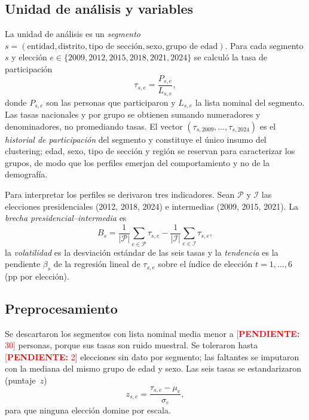 \documentclass[11pt,letterpaper]{article}
\newcommand{\pend}[1]{\textcolor{red}{[\textbf{PENDIENTE:} #1]}}
\begin{document}
\subsection{Unidad de an\'alisis y variables}
La unidad de an\'alisis es un \emph{segmento} $s=(\text{entidad},\text{distrito},\text{tipo de secci\'on},\text{sexo},\text{grupo de edad})$. Para cada segmento $s$ y elecci\'on $e\in\{2009,2012,2015,2018,2021,2024\}$ se calcul\'o la tasa de participaci\'on
\begin{equation}
  \tau_{s,e}=\frac{P_{s,e}}{L_{s,e}},
\end{equation}
donde $P_{s,e}$ son las personas que participaron y $L_{s,e}$ la lista nominal del segmento. Las tasas nacionales y por grupo se obtienen sumando numeradores y denominadores, no promediando tasas. El vector $(\tau_{s,2009},\dots,\tau_{s,2024})$ es el \emph{historial de participaci\'on} del segmento y constituye el \'unico insumo del clustering; edad, sexo, tipo de secci\'on y regi\'on se reservan para caracterizar los grupos, de modo que los perfiles emerjan del comportamiento y no de la demograf\'ia.

Para interpretar los perfiles se derivaron tres indicadores. Sean $\mathcal{P}$ y $\mathcal{I}$ las elecciones presidenciales (2012, 2018, 2024) e intermedias (2009, 2015, 2021). La \emph{brecha presidencial--intermedia} es
\begin{equation}
  B_s=\frac{1}{|\mathcal{P}|}\sum_{e\in\mathcal{P}}\tau_{s,e}-\frac{1}{|\mathcal{I}|}\sum_{e\in\mathcal{I}}\tau_{s,e},
\end{equation}
la \emph{volatilidad} es la desviaci\'on est\'andar de las seis tasas y la \emph{tendencia} es la pendiente $\beta_s$ de la regresi\'on lineal de $\tau_{s,e}$ sobre el \'indice de elecci\'on $t=1,\dots,6$ (pp por elecci\'on).

\subsection{Preprocesamiento}
Se descartaron los segmentos con lista nominal media menor a \pend{30} personas, porque sus tasas son ruido muestral. Se toleraron hasta \pend{2} elecciones sin dato por segmento; las faltantes se imputaron con la mediana del mismo grupo de edad y sexo. Las seis tasas se estandarizaron (puntaje~$z$)
\begin{equation}
  z_{s,e}=\frac{\tau_{s,e}-\mu_e}{\sigma_e},
\end{equation}
para que ninguna elecci\'on domine por escala.
\end{document}
